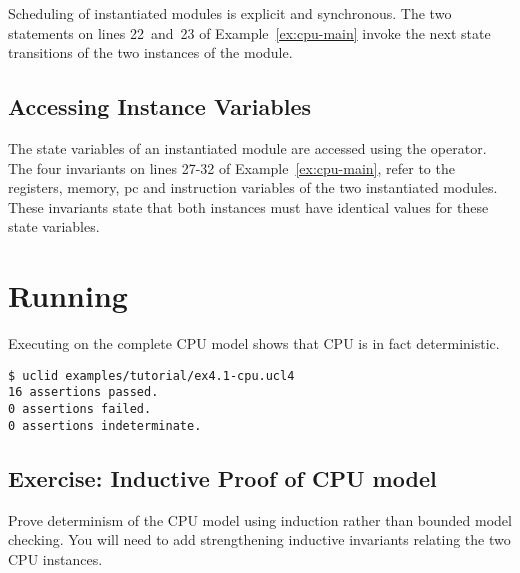 Scheduling of instantiated modules is explicit and synchronous. The two  statements on lines 22~and~23 of Example~\ref{ex:cpu-main} invoke the next state transitions of the two instances of the  module.

\subsection{Accessing Instance Variables}
The state variables of an instantiated module are accessed using the \codelike{->} operator. The four invariants on lines 27-32 of Example~\ref{ex:cpu-main}, refer to the registers, memory, pc and instruction variables of the two instantiated modules. These invariants state that both instances must have identical values for these state variables.


\section{Running \uclid{}}

Executing \uclid{} on the complete CPU model shows that CPU is in fact deterministic. 

\begin{Verbatim}[frame=single, samepage=true]
$ uclid examples/tutorial/ex4.1-cpu.ucl4 
16 assertions passed.
0 assertions failed.
0 assertions indeterminate.
\end{Verbatim}

\subsection{Exercise: Inductive Proof of CPU model}
Prove determinism of the CPU model using induction rather than bounded model checking. You will need to add strengthening inductive invariants relating the two CPU instances.
